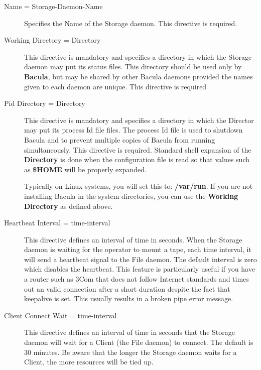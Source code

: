 \begin{description}

\item [Name = \lt{}Storage-Daemon-Name\gt{}]
   Specifies the Name of the Storage daemon. This  directive is required. 

\item [Working Directory = \lt{}Directory\gt{}]
   This directive  is mandatory and specifies a directory in which the Storage
   daemon  may put its status files. This directory should be used only  by {\bf
   Bacula}, but may be shared by other Bacula daemons provided the names
   given to each daemon are unique. This  directive is
   required  

\item [Pid Directory = \lt{}Directory\gt{}]
   This directive  is mandatory and specifies a directory in which the Director 
   may put its process Id file files. The process Id file is used to  shutdown
   Bacula and to prevent multiple copies of  Bacula from running simultaneously. 
   This directive is required. Standard shell expansion of the {\bf Directory} 
   is done when the configuration file is read so that values such  as {\bf
   \$HOME} will be properly expanded.  

   Typically on Linux systems, you will set this to:  {\bf /var/run}. If you are
   not installing Bacula in the  system directories, you can use the {\bf Working
   Directory} as  defined above. 

\item [Heartbeat Interval = \lt{}time-interval\gt{}]
   This directive defines an interval of time in seconds.  When
   the Storage daemon is waiting for the operator to mount a
   tape, each time interval, it will send a heartbeat signal to
   the File daemon.  The default interval is zero which disables
   the heartbeat.  This feature is particularly useful if you
   have a router such as 3Com that does not follow Internet
   standards and times out an valid connection after a short
   duration despite the fact that keepalive is set.  This usually
   results in a broken pipe error message.

\item [Client Connect Wait = \lt{}time-interval\gt{}]
   This directive defines an interval of time in seconds that
   the Storage daemon will wait for a Client (the File daemon)
   to connect.  The default is 30 minutes.  Be aware that the
   longer the Storage daemon waits for a Client, the more
   resources will be tied up.


\end{description}
